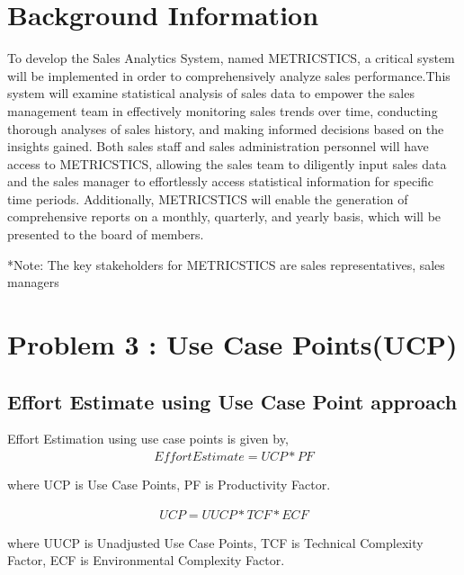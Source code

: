 \documentclass[12pt,letterpaper]{report}
\begin{document}
\listoftables{}


\chapter{Background Information}

To develop the Sales Analytics System, named METRICSTICS, a critical system will be implemented in order to comprehensively analyze sales performance.This system will examine statistical analysis of sales data to empower the sales management team in effectively monitoring sales trends over time, conducting thorough analyses of sales history, and making informed decisions based on the insights gained. Both sales staff and sales administration personnel will have access to METRICSTICS, allowing the sales team to diligently input sales data and the sales manager to effortlessly access statistical information for specific time periods. Additionally, METRICSTICS will enable the generation of comprehensive reports on a monthly, quarterly, and yearly basis, which will be presented to the board of members.		 	 	 	

*Note: The key stakeholders for METRICSTICS are sales representatives, sales managers

\chapter{Problem 3 : Use Case Points(UCP)}
\section{Effort Estimate using Use Case Point approach}
Effort Estimation using use case points is given by,
\begin{align} \label{Effort Estimate}
    Effort Estimate = UCP * PF
\end{align}

where UCP is Use Case Points, PF is Productivity Factor.

\begin{align} \label{Use Case Points}
    UCP=UUCP*TCF*ECF
\end{align}

where UUCP is Unadjusted Use Case Points, TCF is Technical Complexity Factor, ECF is Environmental Complexity Factor.
\end{document}
